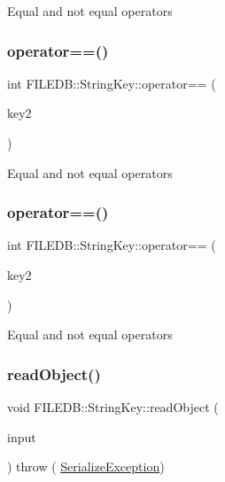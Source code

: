 Equal and not equal operators \mbox{\label{classFILEDB_1_1StringKey_a75f2abcdf7d61bb860156f8758a56a1f}} 
\subsubsection{\texorpdfstring{operator==()}{operator==()}\hspace{0.1cm}{\footnotesize\ttfamily [2/3]}}
{\footnotesize\ttfamily int F\+I\+L\+E\+D\+B\+::\+String\+Key\+::operator== (\begin{DoxyParamCaption}\item[{const \mbox{\hyperlink{classFILEDB_1_1StringKey}{String\+Key}} \&}]{key2 }\end{DoxyParamCaption})}

Equal and not equal operators \mbox{\label{classFILEDB_1_1StringKey_a75f2abcdf7d61bb860156f8758a56a1f}} 
\subsubsection{\texorpdfstring{operator==()}{operator==()}\hspace{0.1cm}{\footnotesize\ttfamily [3/3]}}
{\footnotesize\ttfamily int F\+I\+L\+E\+D\+B\+::\+String\+Key\+::operator== (\begin{DoxyParamCaption}\item[{const \mbox{\hyperlink{classFILEDB_1_1StringKey}{String\+Key}} \&}]{key2 }\end{DoxyParamCaption})}

Equal and not equal operators \mbox{\label{classFILEDB_1_1StringKey_a25cefb184c88bc5bf871245e82ea21f9}} 
\subsubsection{\texorpdfstring{readObject()}{readObject()}\hspace{0.1cm}{\footnotesize\ttfamily [1/3]}}
{\footnotesize\ttfamily void F\+I\+L\+E\+D\+B\+::\+String\+Key\+::read\+Object (\begin{DoxyParamCaption}\item[{const std\+::string \&}]{input }\end{DoxyParamCaption}) throw ( \mbox{\hyperlink{classFILEDB_1_1SerializeException}{Serialize\+Exception}}) \hspace{0.3cm}{\ttfamily [virtual]}}

